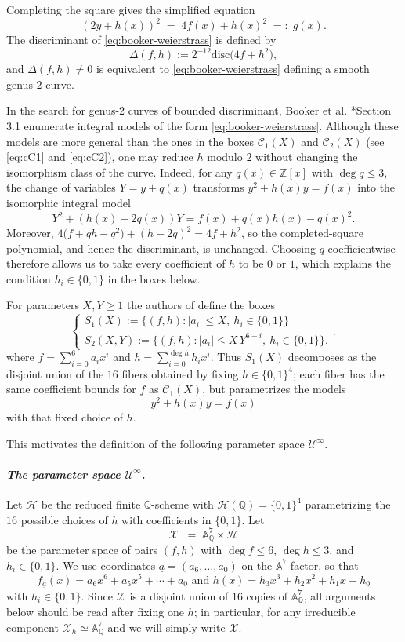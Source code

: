 \documentclass{amsart}
\newcommand{\Q}{{\mathbb Q}}
\newcommand{\X}{\mathcal{X}}
\newcommand{\cC}{\mathcal{C}}
\newcommand{\cH}{\mathcal{H}}
\newcommand{\cU}{\mathcal{U}}
\newcommand{\A}{\mathbb{A}}
\newcommand{\disc}{\mathrm{disc}}
\newcommand{\ua}{\underline{a}}
\begin{document}
Completing the square gives the simplified equation
\begin{equation}\label{eq:booker-square}
  (2y+h(x))^2 \;=\; 4f(x)+h(x)^2 \;=:\; g(x).
\end{equation}
The discriminant of \eqref{eq:booker-weierstrass} is defined by
\[
  \Delta(f,h):=2^{-12}\disc\bigl(4f+h^2\bigr),
\]
and $\Delta(f,h)\neq 0$ is equivalent to \eqref{eq:booker-weierstrass} defining a smooth
genus-$2$ curve.


In the search for genus-$2$ curves of bounded discriminant, Booker et al. \cite{Booker2016}*{Section 3.1} enumerate integral
models of the form \eqref{eq:booker-weierstrass}. Although these models are more general than the ones in the boxes $\cC_1(X)$ and $\cC_2(X)$ (see \eqref{eq:cC1} and \eqref{eq:cC2}), one may reduce
\(h\) modulo \(2\) without changing the isomorphism class of the curve. Indeed,
for any \(q(x)\in \mathbb Z[x]\) with \(\deg q\le 3\), the change of variables
\(Y=y+q(x)\) transforms $y^2+h(x)y=f(x)$
into the isomorphic integral model
\[
   Y^2+(h(x)-2q(x))Y=f(x)+q(x)h(x)-q(x)^2.
\]
Moreover,
$
   4\bigl(f+qh-q^2\bigr)+(h-2q)^2=4f+h^2$,
so the completed-square polynomial, and hence the discriminant, is unchanged.
Choosing \(q\) coefficientwise therefore allows us to take every coefficient of
\(h\) to be \(0\) or \(1\), which explains the condition \(h_i\in\{0,1\}\) in the
boxes below.

For parameters $X,Y\ge 1$  the authors of \cite{Booker2016} define the boxes
\[\left\{
\begin{array}{l}
  S_1(X):=\{(f,h): |a_i|\le X,\ h_i\in\{0,1\}\}\\ 
  S_2(X,Y):=\{(f,h): |a_i|\le X\,Y^{6-i},\ h_i\in\{0,1\}\}.
\end{array}\right.,
\]
where $f=\sum_{i=0}^6a_ix^i$ and $h=\sum_{i=0}^{\deg h}h_ix^i$.
Thus \(S_1(X)\) decomposes as the disjoint union of the \(16\) fibers obtained by
fixing \(h\in\{0,1\}^4\); each fiber has the same coefficient bounds for \(f\) as
\(\mathcal C_1(X)\), but parametrizes the models
\[
   y^2+h(x)y=f(x)
\]
with that fixed choice of \(h\).

This motivates the definition of the following parameter space $\cU^{\infty}$.


\paragraph{\emph{The parameter space $\cU^{\infty}$.}}
Let $\cH$ be the reduced finite $\Q$-scheme with $\cH(\Q)=\{0,1\}^4$ parametrizing the $16$ possible
choices of $h$ with coefficients in $\{0,1\}$.  Let
\[
  \X \;:=\; \mathbb A^7_\Q \times \cH
\]
be the parameter space of pairs $(f,h)$ with $\deg f\le 6$, $\deg h\le 3$, and $h_i\in\{0,1\}$.
We use coordinates $\underline{a}=(a_6,\dots,a_0)$ on the $\A^7$-factor, so that
\[
  f_{\ua}(x)=a_6x^6+a_5x^5+\cdots+a_0 \text{ and }
  h(x)=h_3x^3+h_2x^2+h_1x+h_0
\]
with $h_i \in \{0,1 \}$.
Since $\X$ is a disjoint union of $16$ copies of $\A^7_\Q$, all arguments below should be read after fixing one $h$; in particular, for any irreducible component $\X_h\simeq \A^7_\Q$ and we will simply write $\X$. 
\end{document}
